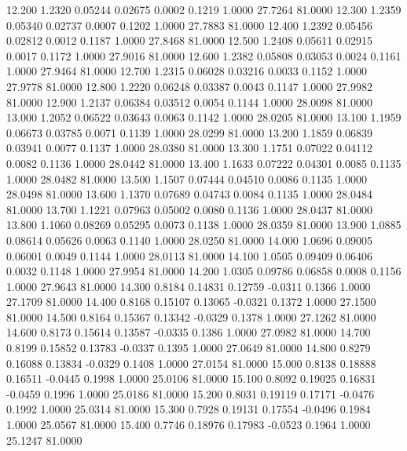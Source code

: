   12.200   1.2320   0.05244   0.02675   0.0002   0.1219   1.0000  27.7264  81.0000
  12.300   1.2359   0.05340   0.02737   0.0007   0.1202   1.0000  27.7883  81.0000
  12.400   1.2392   0.05456   0.02812   0.0012   0.1187   1.0000  27.8468  81.0000
  12.500   1.2408   0.05611   0.02915   0.0017   0.1172   1.0000  27.9016  81.0000
  12.600   1.2382   0.05808   0.03053   0.0024   0.1161   1.0000  27.9464  81.0000
  12.700   1.2315   0.06028   0.03216   0.0033   0.1152   1.0000  27.9778  81.0000
  12.800   1.2220   0.06248   0.03387   0.0043   0.1147   1.0000  27.9982  81.0000
  12.900   1.2137   0.06384   0.03512   0.0054   0.1144   1.0000  28.0098  81.0000
  13.000   1.2052   0.06522   0.03643   0.0063   0.1142   1.0000  28.0205  81.0000
  13.100   1.1959   0.06673   0.03785   0.0071   0.1139   1.0000  28.0299  81.0000
  13.200   1.1859   0.06839   0.03941   0.0077   0.1137   1.0000  28.0380  81.0000
  13.300   1.1751   0.07022   0.04112   0.0082   0.1136   1.0000  28.0442  81.0000
  13.400   1.1633   0.07222   0.04301   0.0085   0.1135   1.0000  28.0482  81.0000
  13.500   1.1507   0.07444   0.04510   0.0086   0.1135   1.0000  28.0498  81.0000
  13.600   1.1370   0.07689   0.04743   0.0084   0.1135   1.0000  28.0484  81.0000
  13.700   1.1221   0.07963   0.05002   0.0080   0.1136   1.0000  28.0437  81.0000
  13.800   1.1060   0.08269   0.05295   0.0073   0.1138   1.0000  28.0359  81.0000
  13.900   1.0885   0.08614   0.05626   0.0063   0.1140   1.0000  28.0250  81.0000
  14.000   1.0696   0.09005   0.06001   0.0049   0.1144   1.0000  28.0113  81.0000
  14.100   1.0505   0.09409   0.06406   0.0032   0.1148   1.0000  27.9954  81.0000
  14.200   1.0305   0.09786   0.06858   0.0008   0.1156   1.0000  27.9643  81.0000
  14.300   0.8184   0.14831   0.12759  -0.0311   0.1366   1.0000  27.1709  81.0000
  14.400   0.8168   0.15107   0.13065  -0.0321   0.1372   1.0000  27.1500  81.0000
  14.500   0.8164   0.15367   0.13342  -0.0329   0.1378   1.0000  27.1262  81.0000
  14.600   0.8173   0.15614   0.13587  -0.0335   0.1386   1.0000  27.0982  81.0000
  14.700   0.8199   0.15852   0.13783  -0.0337   0.1395   1.0000  27.0649  81.0000
  14.800   0.8279   0.16088   0.13834  -0.0329   0.1408   1.0000  27.0154  81.0000
  15.000   0.8138   0.18888   0.16511  -0.0445   0.1998   1.0000  25.0106  81.0000
  15.100   0.8092   0.19025   0.16831  -0.0459   0.1996   1.0000  25.0186  81.0000
  15.200   0.8031   0.19119   0.17171  -0.0476   0.1992   1.0000  25.0314  81.0000
  15.300   0.7928   0.19131   0.17554  -0.0496   0.1984   1.0000  25.0567  81.0000
  15.400   0.7746   0.18976   0.17983  -0.0523   0.1964   1.0000  25.1247  81.0000

